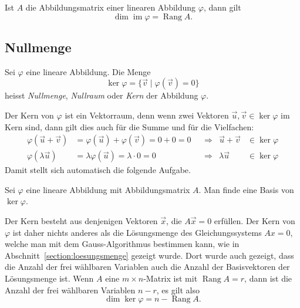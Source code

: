 \begin{satz}
Ist $A$ die Abbildungsmatrix einer linearen Abbildung $\varphi$, dann
gilt
\[
\dim\operatorname{im}\varphi = \operatorname{Rang}A.
\]
\end{satz}

\subsection{Nullmenge}
\begin{definition}
Sei $\varphi$ eine lineare Abbildung.
Die Menge
\[
\operatorname{ker}\varphi = \{\vec{v}\;|\; \varphi(\vec{v}) = 0\}
\]
heisst {\em Nullmenge}, {\em Nullraum} oder {\em Kern} der Abbildung
$\varphi$.
\end{definition}

Der Kern von $\varphi$ ist ein Vektorraum, denn wenn zwei Vektoren
$\vec{u},\vec{v}\in\ker\varphi$ im Kern sind, dann gilt dies
auch für die Summe und für die Vielfachen:
\[
\begin{aligned}
\varphi(\vec{u}+\vec{v})
&=
\varphi(\vec{u})+\varphi(\vec{v})
=
0+0=0
&&\Rightarrow&
\vec{u}+\vec{v}&\in\ker\varphi
\\
\varphi(\lambda\vec{u})
&=
\lambda\varphi(\vec{u}) = \lambda\cdot 0=0
&&\Rightarrow&
\lambda\vec{u}&\in\ker\varphi
\end{aligned}
\]
Damit stellt sich automatisch die folgende Aufgabe.

\begin{aufgabe}
Sei $\varphi$ eine lineare Abbildung mit Abbildungsmatrix $A$.
Man finde eine Basis von $\ker\varphi$.
\end{aufgabe}

Der Kern besteht aus denjenigen Vektoren $\vec{x}$, die $A\vec{x}=0$
erfüllen.
Der Kern von $\varphi$ ist daher nichts anderes als die Lösungsmenge
des Gleichungssystems $Ax=0$, welche man mit dem Gauss-Algorithmus
bestimmen kann, wie in Abschnitt~\ref{section:loesungsmenge} gezeigt
wurde.
Dort wurde auch gezeigt, dass die Anzahl der frei wählbaren Variablen
auch die Anzahl der Basisvektoren der Lösungsmenge ist.
Wenn $A$ eine $m\times n$-Matrix ist mit $\operatorname{Rang}A=r$,
dann ist die Anzahl der frei wählbaren Variablen $n-r$, es gilt
also
\[
\dim\ker \varphi = n -\operatorname{Rang}A.
\]

